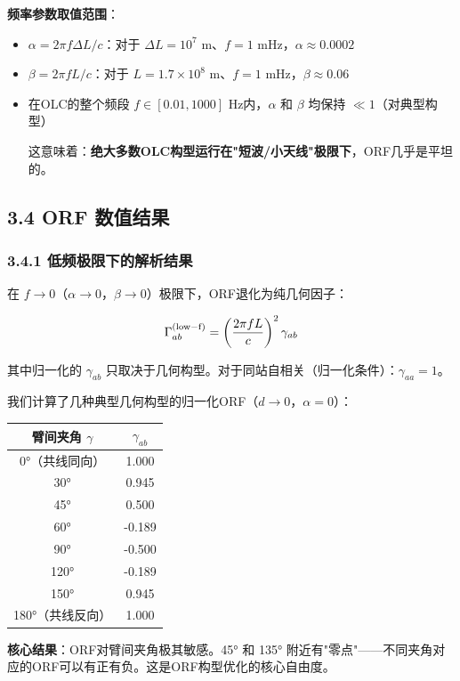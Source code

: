 \documentclass[12pt,a4paper]{article}
\begin{document}
\textbf{频率参数取值范围}：

\begin{itemize}
  \item $\alpha = 2\pi f \Delta L / c$：对于 $\Delta L = 10^7$ m、$f = 1$ mHz，$\alpha \approx 0.0002$
  \item $\beta = 2\pi f L / c$：对于 $L = 1.7 \times 10^8$ m、$f = 1$ mHz，$\beta \approx 0.06$
  \item 在OLC的整个频段 $f \in [0.01, 1000]$ Hz内，$\alpha$ 和 $\beta$ 均保持 $\ll 1$（对典型构型）

这意味着：\textbf{绝大多数OLC构型运行在"短波/小天线"极限下}，ORF几乎是平坦的。

\end{itemize}
\subsection{3.4 ORF 数值结果}


\subsubsection{3.4.1 低频极限下的解析结果}


在 $f \to 0$（$\alpha \to 0$，$\beta \to 0$）极限下，ORF退化为纯几何因子：

$$\Gamma_{ab}^{\rm (low-f)} = \left(\frac{2\pi f L}{c}\right)^2 \gamma_{ab}$$

其中归一化的 $\gamma_{ab}$ 只取决于几何构型。对于同站自相关（归一化条件）：$\gamma_{aa} = 1$。

我们计算了几种典型几何构型的归一化ORF（$d \to 0$，$\alpha = 0$）：

\begin{tabular}{|c|c|}
\hline
臂间夹角 $\gamma$ & $\gamma_{ab}$ \\
\hline
0°（共线同向） & 1.000 \\
30° & 0.945 \\
45° & 0.500 \\
60° & -0.189 \\
90° & -0.500 \\
120° & -0.189 \\
150° & 0.945 \\
180°（共线反向） & 1.000 \\
\hline
\end{tabular}


\textbf{核心结果}：ORF对臂间夹角极其敏感。45° 和 135° 附近有"零点"——不同夹角对应的ORF可以有正有负。这是ORF构型优化的核心自由度。
\end{document}
